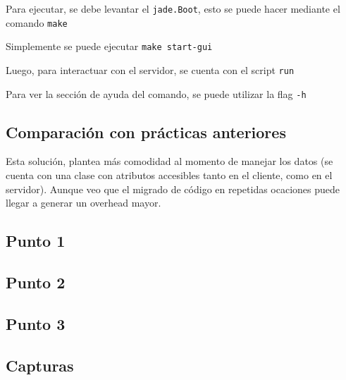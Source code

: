 \documentclass[12pt,journal,compsoc]{IEEEtran}
\begin{document}
Para ejecutar, se debe levantar el \texttt{jade.Boot}, esto se puede hacer
mediante el comando \texttt{make}

Simplemente se puede ejecutar \texttt{make start-gui}

Luego, para interactuar con el servidor, se cuenta con el script \texttt{run}

Para ver la sección de ayuda del comando, se puede utilizar la flag \texttt{-h}

\subsection{Comparación con prácticas anteriores}

Esta solución, plantea más comodidad al momento de manejar los datos
(se cuenta con una clase con atributos accesibles tanto en el cliente,
como en el servidor). Aunque veo que el migrado de código en repetidas
ocaciones puede llegar a generar un overhead mayor.

\newpage
\onecolumn
{}
\label{appendix:codigo-java}

\subsection{Punto 1}
\label{section:code-punto1}


\subsection{Punto 2}
\label{section:code-punto2}


\subsection{Punto 3}
\label{section:code-punto3}


\newpage
\subsection{Capturas}
\end{document}
